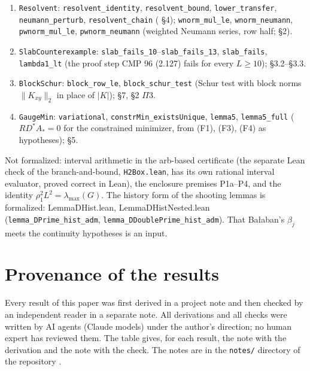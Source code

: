 \begin{itemize}
\begin{enumerate}
\item \texttt{Resolvent}: \texttt{resolvent\_identity}, \texttt{resolvent\_bound}, \texttt{lower\_transfer}, \texttt{neumann\_perturb}, \texttt{resolvent\_chain} ( \S4); \texttt{wnorm\_mul\_le}, \texttt{wnorm\_neumann}, \texttt{pwnorm\_mul\_le}, \texttt{pwnorm\_neumann} (weighted Neumann series, row half;  \S2).
\item \texttt{SlabCounterexample}: \texttt{slab\_fails\_10}--\texttt{slab\_fails\_13}, \texttt{slab\_fails}, \texttt{lambda1\_lt} (the proof step CMP 96 (2.127) fails for every $L\ge10$);  \S3.2--\S3.3.
\item \texttt{BlockSchur}: \texttt{block\_row\_le}, \texttt{block\_schur\_test} (Schur test with block norms $\|K_{xy}\|_2$ in place of $|K|$);  \S7,  \S2 $\Pi3$.
\item \texttt{GaugeMin}: \texttt{variational}, \texttt{constrMin\_existsUnique}, \texttt{lemma5}, \texttt{lemma5\_full} ($RD^*A_*=0$ for the constrained minimizer, from (F1), (F3), (F4) as hypotheses);  \S5.
\end{enumerate}
Not formalized: interval arithmetic in the arb-based certificate (the separate Lean check of the branch-and-bound, \texttt{H2Box.lean}, has its own rational interval evaluator, proved correct in Lean), the enclosure premises P1a--P4, and the identity $\rho_1^2L^2=\lambda_{\max}(G)$. The history form of the shooting lemmas is formalized: LemmaDHist.lean, LemmaDHistNested.lean (\texttt{lemma\_DPrime\_hist\_adm}, \texttt{lemma\_DDoublePrime\_hist\_adm}). That Ba{\l}aban's $\beta_j$ meets the continuity hypotheses is an input.
\end{itemize}

\section{Provenance of the results}\label{app:ledger}\label{app:history}

Every result of this paper was first derived in a project note and then checked by an independent reader in a separate note. All derivations and all checks were written by AI agents (Claude models) under the author's direction; no human expert has reviewed them. The table gives, for each result, the note with the derivation and the note with the check. The notes are in the \texttt{notes/} directory of the repository \cite{ymrepo}.

